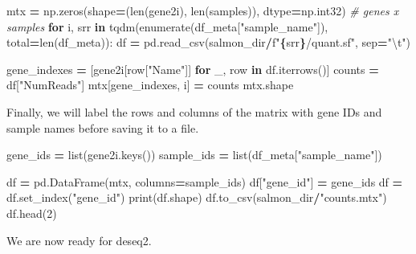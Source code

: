 \documentclass[
]{book}
\newenvironment{Shaded}{\begin{snugshade}}{\end{snugshade}}
\newcommand{\BuiltInTok}[1]{#1}
\newcommand{\CharTok}[1]{\textcolor[rgb]{0.31,0.60,0.02}{#1}}
\newcommand{\CommentTok}[1]{\textcolor[rgb]{0.56,0.35,0.01}{\textit{#1}}}
\newcommand{\ControlFlowTok}[1]{\textcolor[rgb]{0.13,0.29,0.53}{\textbf{#1}}}
\newcommand{\DecValTok}[1]{\textcolor[rgb]{0.00,0.00,0.81}{#1}}
\newcommand{\KeywordTok}[1]{\textcolor[rgb]{0.13,0.29,0.53}{\textbf{#1}}}
\newcommand{\NormalTok}[1]{#1}
\newcommand{\OperatorTok}[1]{\textcolor[rgb]{0.81,0.36,0.00}{\textbf{#1}}}
\newcommand{\SpecialCharTok}[1]{\textcolor[rgb]{0.81,0.36,0.00}{\textbf{#1}}}
\newcommand{\SpecialStringTok}[1]{\textcolor[rgb]{0.31,0.60,0.02}{#1}}
\newcommand{\StringTok}[1]{\textcolor[rgb]{0.31,0.60,0.02}{#1}}
\begin{document}
\begin{Shaded}
\begin{Highlighting}[numbers=left,,]
\NormalTok{mtx }\OperatorTok{=}\NormalTok{ np.zeros(shape}\OperatorTok{=}\NormalTok{(}\BuiltInTok{len}\NormalTok{(gene2i), }\BuiltInTok{len}\NormalTok{(samples)), dtype}\OperatorTok{=}\NormalTok{np.int32) }\CommentTok{\# genes x samples}
\ControlFlowTok{for}\NormalTok{ i, srr }\KeywordTok{in}\NormalTok{ tqdm(}\BuiltInTok{enumerate}\NormalTok{(df\_meta[}\StringTok{"sample\_name"}\NormalTok{]), total}\OperatorTok{=}\BuiltInTok{len}\NormalTok{(df\_meta)):}
\NormalTok{    df }\OperatorTok{=}\NormalTok{ pd.read\_csv(salmon\_dir}\OperatorTok{/}\SpecialStringTok{f"}\SpecialCharTok{\{}\NormalTok{srr}\SpecialCharTok{\}}\SpecialStringTok{/quant.sf"}\NormalTok{, sep}\OperatorTok{=}\StringTok{"}\CharTok{\textbackslash{}t}\StringTok{"}\NormalTok{)}

\NormalTok{    gene\_indexes }\OperatorTok{=}\NormalTok{ [gene2i[row[}\StringTok{"Name"}\NormalTok{]] }\ControlFlowTok{for}\NormalTok{ \_, row }\KeywordTok{in}\NormalTok{ df.iterrows()]}
\NormalTok{    counts }\OperatorTok{=}\NormalTok{ df[}\StringTok{"NumReads"}\NormalTok{]}
\NormalTok{    mtx[gene\_indexes, i] }\OperatorTok{=}\NormalTok{ counts}
\NormalTok{mtx.shape}
\end{Highlighting}
\end{Shaded}

Finally, we will label the rows and columns of the matrix with gene IDs and sample names before saving it to a file.

\begin{Shaded}
\begin{Highlighting}[numbers=left,,]
\NormalTok{gene\_ids }\OperatorTok{=} \BuiltInTok{list}\NormalTok{(gene2i.keys())}
\NormalTok{sample\_ids }\OperatorTok{=} \BuiltInTok{list}\NormalTok{(df\_meta[}\StringTok{"sample\_name"}\NormalTok{])}

\NormalTok{df }\OperatorTok{=}\NormalTok{ pd.DataFrame(mtx, columns}\OperatorTok{=}\NormalTok{sample\_ids)}
\NormalTok{df[}\StringTok{"gene\_id"}\NormalTok{] }\OperatorTok{=}\NormalTok{ gene\_ids}
\NormalTok{df }\OperatorTok{=}\NormalTok{ df.set\_index(}\StringTok{"gene\_id"}\NormalTok{)}
\BuiltInTok{print}\NormalTok{(df.shape)}
\NormalTok{df.to\_csv(salmon\_dir}\OperatorTok{/}\StringTok{"counts.mtx"}\NormalTok{)}
\NormalTok{df.head(}\DecValTok{2}\NormalTok{)}
\end{Highlighting}
\end{Shaded}

We are now ready for deseq2.
\end{document}
